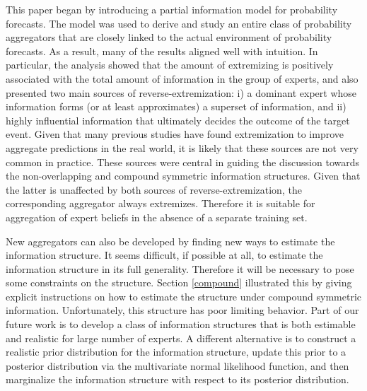 \documentclass[11pt,twoside]{article}
\theoremstyle{definition}
\theoremstyle{definition}
\begin{document}


This paper began by introducing a partial information model for probability forecasts. The model was used to derive and study an entire class of probability aggregators that are closely linked to the actual environment of probability forecasts. As a result, many of the results aligned well with intuition.  In particular, the analysis showed that the amount of extremizing is positively associated with the total amount of information in the group of experts, and also presented two main sources of reverse-extremization: i) a dominant expert whose information forms (or at least approximates) a superset of information, and ii) highly influential information that ultimately decides the outcome of the target event. Given that many previous studies have found extremization to improve aggregate predictions in the real world, it is likely that these sources are not very common in practice. These sources were central in guiding the discussion towards the non-overlapping and compound symmetric information structures. Given that the latter is unaffected by both sources of reverse-extremization, the corresponding aggregator always extremizes. Therefore it is suitable for aggregation of expert beliefs in the absence of a separate training set.

New aggregators can also be developed by finding new ways to estimate the information structure. It seems difficult, if possible at all, to estimate the information structure in its full generality. Therefore it will be necessary to pose some constraints on the structure. Section \ref{compound} illustrated this by giving explicit instructions on how to estimate the structure under compound symmetric information. Unfortunately, this structure has poor limiting behavior. Part of our future work is to develop a class of information structures that is  both estimable and realistic for large number of experts.  A different alternative is to construct a realistic prior distribution for the information structure, update this prior to a posterior distribution via the multivariate normal likelihood function, and then marginalize the information structure with respect to its posterior distribution.  
\end{document}
